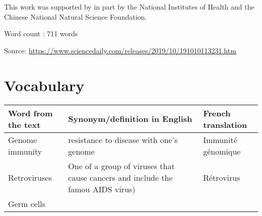 \documentclass[]{article}
\begin{document}
This work was supported by in part by the National Institutes of Health
and the Chinese National Natural Science Foundation.

Word count : 711 words

Source:
\url{https://www.sciencedaily.com/releases/2019/10/191010113231.htm}

\hypertarget{vocabulary}{%
\section{Vocabulary}\label{vocabulary}}

\begin{longtable}[]{@{}lll@{}}
\toprule
\begin{minipage}[b]{0.18\columnwidth}\raggedright
Word from the text\strut
\end{minipage} & \begin{minipage}[b]{0.18\columnwidth}\raggedright
Synonym/definition in English\strut
\end{minipage} & \begin{minipage}[b]{0.56\columnwidth}\raggedright
French translation\strut
\end{minipage}\tabularnewline
\midrule
\endhead
\begin{minipage}[t]{0.18\columnwidth}\raggedright
Genome immunity\strut
\end{minipage} & \begin{minipage}[t]{0.18\columnwidth}\raggedright
resistance to disease with one's genome\strut
\end{minipage} & \begin{minipage}[t]{0.56\columnwidth}\raggedright
Immunité génomique\strut
\end{minipage}\tabularnewline
\begin{minipage}[t]{0.18\columnwidth}\raggedright
Retroviruses\strut
\end{minipage} & \begin{minipage}[t]{0.18\columnwidth}\raggedright
One of a group of viruses that cause cancers and include the famou AIDS
virus)\strut
\end{minipage} & \begin{minipage}[t]{0.56\columnwidth}\raggedright
Rétrovirus\strut
\end{minipage}\tabularnewline
\begin{minipage}[t]{0.18\columnwidth}\raggedright
Germ cells\strut
\end{minipage} & \begin{minipage}[t]{0.18\columnwidth}\raggedright

\end{minipage}
\end{longtable}
\end{document}

